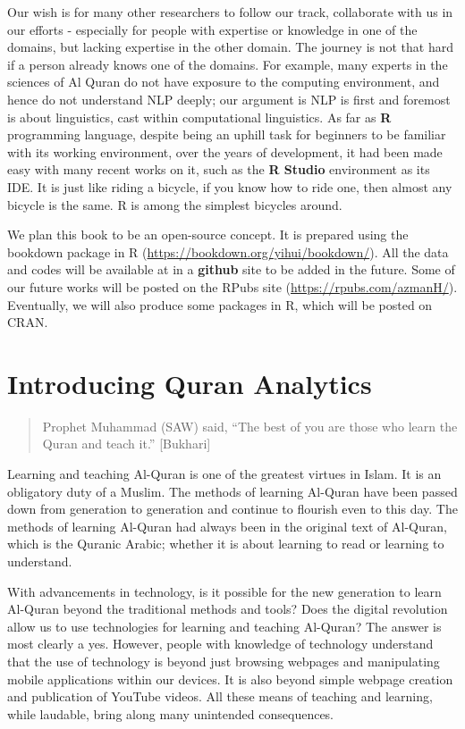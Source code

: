 \documentclass[
]{article}
\begin{document}
Our wish is for many other researchers to follow our track, collaborate with us in our efforts - especially for people with expertise or knowledge in one of the domains, but lacking expertise in the other domain. The journey is not that hard if a person already knows one of the domains. For example, many experts in the sciences of Al Quran do not have exposure to the computing environment, and hence do not understand NLP deeply; our argument is NLP is first and foremost is about linguistics, cast within computational linguistics. As far as \textbf{R} programming language, despite being an uphill task for beginners to be familiar with its working environment, over the years of development, it had been made easy with many recent works on it, such as the \textbf{R Studio} environment as its IDE. It is just like riding a bicycle, if you know how to ride one, then almost any bicycle is the same. R is among the simplest bicycles around.

We plan this book to be an open-source concept. It is prepared using the bookdown package in R (\url{https://bookdown.org/yihui/bookdown/}). All the data and codes will be available at in a \textbf{github} site to be added in the future. Some of our future works will be posted on the RPubs site (\url{https://rpubs.com/azmanH/}). Eventually, we will also produce some packages in R, which will be posted on CRAN.

\hypertarget{introducing-quran-analytics}{%
\section{Introducing Quran Analytics}\label{introducing-quran-analytics}}

\begin{quote}
Prophet Muhammad (SAW) said, ``The best of you are those who learn the Quran and teach it.'' {[}Bukhari{]}
\end{quote}

Learning and teaching Al-Quran is one of the greatest virtues in Islam. It is an obligatory duty of a Muslim. The methods of learning Al-Quran have been passed down from generation to generation and continue to flourish even to this day. The methods of learning Al-Quran had always been in the original text of Al-Quran, which is the Quranic Arabic; whether it is about learning to read or learning to understand.

With advancements in technology, is it possible for the new generation to learn Al-Quran beyond the traditional methods and tools? Does the digital revolution allow us to use technologies for learning and teaching Al-Quran? The answer is most clearly a yes. However, people with knowledge of technology understand that the use of technology is beyond just browsing webpages and manipulating mobile applications within our devices. It is also beyond simple webpage creation and publication of YouTube videos. All these means of teaching and learning, while laudable, bring along many unintended consequences.
\end{document}
